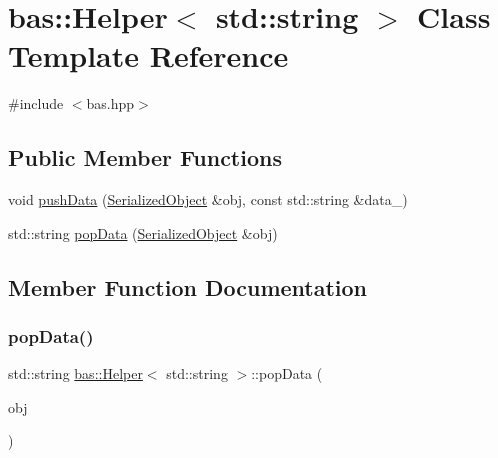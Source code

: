 \hypertarget{classbas_1_1Helper_3_01std_1_1string_01_4}{}\section{bas\+::Helper$<$ std\+::string $>$ Class Template Reference}
\label{classbas_1_1Helper_3_01std_1_1string_01_4}


{\ttfamily \#include $<$bas.\+hpp$>$}

\subsection*{Public Member Functions}
\begin{DoxyCompactItemize}
\item 
void \mbox{\hyperlink{classbas_1_1Helper_3_01std_1_1string_01_4_a0920a17eddecfc9f5e54fd66638512ea}{push\+Data}} (\mbox{\hyperlink{classbas_1_1SerializedObject}{Serialized\+Object}} \&obj, const std\+::string \&data\+\_\+)
\item 
std\+::string \mbox{\hyperlink{classbas_1_1Helper_3_01std_1_1string_01_4_a004ac20d640478e68e839a28c2e9e9e3}{pop\+Data}} (\mbox{\hyperlink{classbas_1_1SerializedObject}{Serialized\+Object}} \&obj)
\end{DoxyCompactItemize}


\subsection{Member Function Documentation}
\mbox{\label{classbas_1_1Helper_3_01std_1_1string_01_4_a004ac20d640478e68e839a28c2e9e9e3}} 
\subsubsection{\texorpdfstring{popData()}{popData()}}
{\footnotesize\ttfamily std\+::string \mbox{\hyperlink{classbas_1_1Helper}{bas\+::\+Helper}}$<$ std\+::string $>$\+::pop\+Data (\begin{DoxyParamCaption}\item[{\mbox{\hyperlink{classbas_1_1SerializedObject}{Serialized\+Object}} \&}]{obj }\end{DoxyParamCaption})\hspace{0.3cm}{\ttfamily [inline]}}

